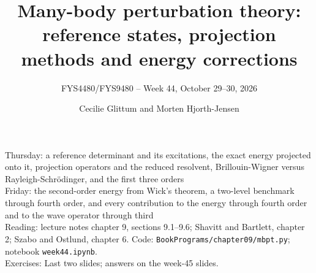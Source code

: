 \documentclass[aspectratio=169,10pt]{beamer}
\title{Many-body perturbation theory: reference states, projection methods and energy corrections}
\subtitle{FYS4480/FYS9480 -- Week 44, October 29--30, 2026}
\author{Cecilie Glittum and Morten Hjorth-Jensen}
\institute{Department of Physics,\\
University of Oslo, Norway}
\date{}
\begin{document}
\begin{frame}[plain]
  \vfill
  \begin{center}\small
  Thursday: a reference determinant and its excitations, the exact energy projected onto it, projection operators and the reduced resolvent, Brillouin-Wigner versus Rayleigh-Schr\"odinger, and the first three orders\\
  Friday: the second-order energy from Wick's theorem, a two-level benchmark through fourth order, and every contribution to the energy through fourth order and to the wave operator through third\\[0.8em]
  {\footnotesize Reading: lecture notes chapter 9, sections 9.1--9.6; Shavitt and Bartlett, chapter 2; Szabo and Ostlund, chapter 6. Code: \texttt{BookPrograms/chapter09/mbpt.py}; notebook \texttt{week44.ipynb}.\\[0.2em]
  Exercises: Last two slides; answers on the week-45 slides.}
  \end{center}
\end{frame}
\end{document}
